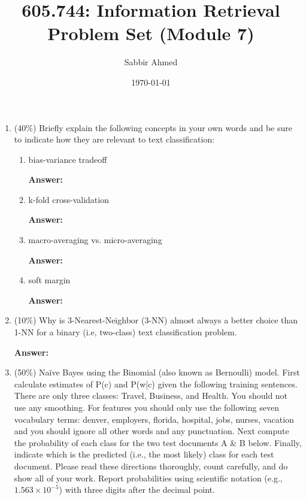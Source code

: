 \documentclass[11pt]{article}
\title{605.744: Information Retrieval \\ Problem Set (Module 7)}
\author{Sabbir Ahmed}
\date{\today}
\begin{document}
\maketitle

    \begin{enumerate}

        \item (40\%) Briefly explain the following concepts in your own words and be sure to indicate how they are relevant to text classification:
        
        \begin{enumerate}
            \item bias-variance tradeoff

            \textbf{Answer:}

            \item k-fold cross-validation

            \textbf{Answer:}

            \item macro-averaging vs. micro-averaging

            \textbf{Answer:}

            \item soft margin

            \textbf{Answer:}

        \end{enumerate}

        \item (10\%) Why is 3-Nearest-Neighbor (3-NN) almost always a better choice than 1-NN for a binary (i.e, two-class) text classification problem.

        \textbf{Answer:}

        \item (50\%) Naïve Bayes using the Binomial (also known as Bernoulli) model. First calculate estimates of P(c) and P(w|c) given the following training sentences. There are only three classes: Travel, Business, and Health. You should not use any smoothing. For features you should only use the following seven vocabulary terms: {denver, employers, florida, hospital, jobs, nurses, vacation} and you should ignore all other words and any punctuation. Next compute the probability of each class for the two test documents A \& B below. Finally, indicate which is the predicted (i.e., the most likely) class for each test document. Please read these directions thoroughly, count carefully, and do show all of your work. Report probabilities using scientific notation (e.g., $1.563 \times 10^{-5}$) with three digits after the decimal point.


\end{enumerate}
\end{document}
